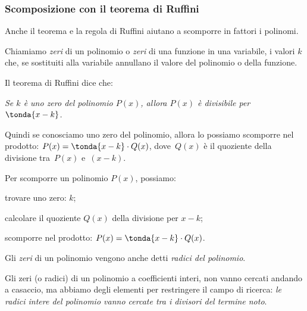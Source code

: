 
\subsubsection{Scomposizione con il teorema di Ruffini}
\label{subsubsec:divpol_scompruff}

Anche il teorema e la regola di Ruffini aiutano a scomporre in fattori i 
polinomi.

Chiamiamo \emph{zeri} di un 
polinomio o \emph{zeri} di una funzione in 
una variabile, i valori \(k\) che, se sostituiti alla variabile annullano il 
valore del polinomio o della funzione. 

Il teorema di Ruffini dice che:

\begin{center}
\emph{Se \(k\) è uno zero del polinomio \(P(x)\), allora  
\(P(x)\) è divisibile per \(\tonda{x-k}\).}
\end{center}

Quindi se conosciamo uno zero del polinomio, allora lo possiamo 
scomporre nel prodotto: \(P(x) = \tonda{x-k} \cdot Q(x)\), 
dove~\(Q(x)\) è il quoziente della divisione tra~\(P(x)\) e~\((x-k)\).

\begin{procedura}{}{}
Per scomporre un polinomio \(P(x)\), possiamo:
\begin{enumeratea}
\item trovare uno zero: \(k\);
\item calcolare il quoziente \(Q(x)\) della divisione per \(x-k\);
\item scomporre nel prodotto: \(P(x) = \tonda{x-k} \cdot Q(x)\).
\end{enumeratea}
\end{procedura}

Gli \emph{zeri} di un polinomio vengono anche detti \emph{radici del 
polinomio}.

Gli zeri (o radici) di un polinomio a coefficienti interi, non vanno cercati 
andando a casaccio, ma abbiamo degli elementi per restringere il campo di 
ricerca: 
\emph{le radici intere del polinomio vanno cercate tra i divisori del 
termine noto}.


